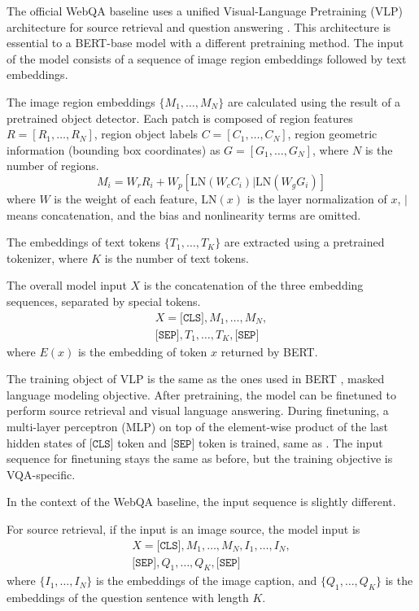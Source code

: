 \documentclass[nohyperref]{article}
\theoremstyle{plain}
\theoremstyle{definition}
\theoremstyle{remark}
\begin{document}
The official WebQA baseline uses a unified Visual-Language Pretraining (VLP) architecture for source retrieval and question answering \cite{vlp}.
This architecture is essential to a BERT-base \cite{BERT} model with a different pretraining method.
The input of the model consists of a sequence of image region embeddings followed by text embeddings.

The image region embeddings $\{M_1, \dots, M_N\}$ are calculated using the result of a pretrained object detector.
Each patch is composed of region features $R = [R_1, \dots, R_N]$, region object labels $C = [C_1, \dots, C_N]$, region geometric information (bounding box coordinates) as $G = [G_1, \dots, G_N]$, where $N$ is the number of regions.
\begin{equation}
 M_i = W_r R_i + W_p \left[\text{LN}(W_c C_i) | \text{LN}(W_g G_i)\right] 
\end{equation}
where $W$ is the weight of each feature, $\text{LN}(x)$ is the layer normalization of $x$, $|$ means concatenation, and the bias and nonlinearity terms are omitted.

The embeddings of text tokens $\{T_1, \dots, T_K\}$ are extracted using a pretrained tokenizer, where $K$ is the number of text tokens.

The overall model input $X$ is the concatenation of the three embedding sequences, separated by special tokens.
\begin{gather*}
    X = \texttt{[CLS]}, M_1, \dots, M_N, \\
    \texttt{[SEP]}, T_1, \dots, T_K, \texttt{[SEP]}
\end{gather*}
where $E(x)$ is the embedding of token $x$ returned by BERT.

The training object of VLP is the same as the ones used in BERT \cite{BERT}, masked language modeling objective. After pretraining, the model can be finetuned to perform source retrieval and visual language answering.
During finetuning, a multi-layer perceptron (MLP) on top of the element-wise
product of the last hidden states of $\texttt{[CLS]}$ token and $\texttt{[SEP]}$ token is trained, same as \cite{vilbert}.
The input sequence for finetuning stays the same as before, but the training objective is VQA-specific.

In the context of the WebQA baseline, the input sequence is slightly different.

For source retrieval, if the input is an image source, the model input is
\begin{gather*}
    X = \texttt{[CLS]}, M_1, \dots, M_N, I_1, \dots, I_N, \\
    \texttt{[SEP]}, Q_1, \dots, Q_K, \texttt{[SEP]}
\end{gather*}
where $\{I_1, \dots, I_N\}$ is the embeddings of the image caption, and $\{Q_1, \dots, Q_K\}$ is the embeddings of the question sentence with length $K$.
\end{document}
